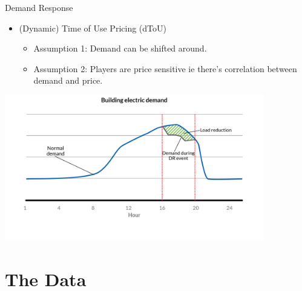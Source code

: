 \documentclass{beamer}
\begin{document}
\begin{frame}{Demand Response}
  \begin{itemize}
    \item (Dynamic) Time of Use Pricing (dToU)
    \begin{itemize}
      \item Assumption 1: Demand can be shifted around.
      \item Assumption 2: Players are price sensitive ie there's correlation between demand and price.
    \end{itemize}
  \end{itemize}
  \vspace{0.5cm}
  \centering
  \includegraphics[width=0.85\textwidth]{images/demand-response.png}
\end{frame}

\section{The Data}
\end{document}
